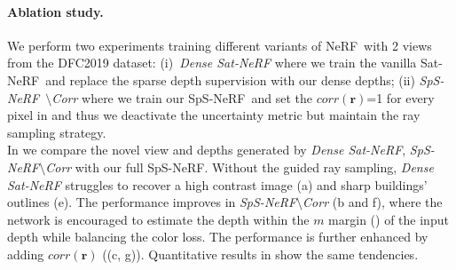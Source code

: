 \documentclass{isprs} %
\newcommand{\Nerf}{{NeRF}}
\newcommand{\OurNeRFShort}{{SpS-NeRF}}
\begin{document}
\paragraph{Ablation study.} We perform two experiments training different variants of \Nerf~with 2 views from the DFC2019 dataset: (i)~\textit{Dense Sat-\Nerf} where we train the vanilla Sat-\Nerf~and replace the sparse depth supervision with our dense depths; (ii) \textit{\OurNeRFShort~$\setminus$Corr} where we train our \OurNeRFShort~and set the $corr(\textbf{r})$=1 for every pixel in  and  thus we deactivate the uncertainty metric but maintain the ray sampling strategy.\\
In  we compare the novel view and depths generated by \textit{Dense Sat-\Nerf}, \textit{\OurNeRFShort$\setminus$Corr} with our full \OurNeRFShort. Without the guided ray sampling, \textit{Dense Sat-\Nerf} struggles to recover a high contrast image (a) and sharp buildings' outlines (e). The performance  improves in \textit{\OurNeRFShort$\setminus$Corr} (b and f), where the network is encouraged to estimate the depth within the $m$ margin () of the input depth while balancing the color loss. The performance is further enhanced by adding $corr(\textbf{r})$ ((c, g)). Quantitative results in  show the same tendencies.



\end{document}
